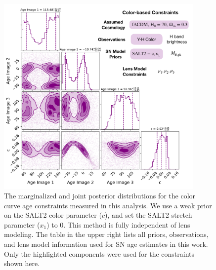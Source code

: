 \documentclass[12pt]{article}
\begin{document}
{\begin{figure}
    \centering
    \includegraphics[width=0.9\textwidth]{Paper/Figures/corner_color_curve_fit_with_c_prior_labels.pdf}
    \caption{The marginalized and joint posterior distributions for the color curve age constraints measured in this analysis. We use a weak prior on the SALT2 color parameter ($c$), and set the SALT2 stretch parameter ($x_1$) to 0. This method is fully independent of lens modeling.  The table in the upper right lists all 
    priors, observations, and lens model information
    used for SN age estimates in this work.  
    Only the highlighted 
    components were used for the constraints shown here.}
    \label{fig:corner_cfit}
\end{figure}

}
\end{document}
